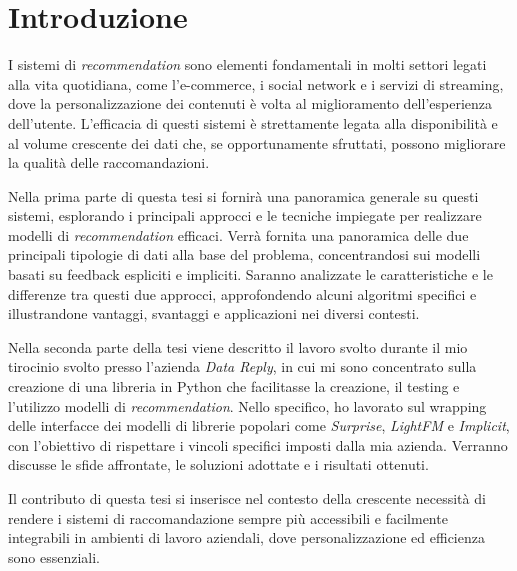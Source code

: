 \chapter{Introduzione}

I sistemi di \textit{recommendation} sono elementi fondamentali in molti settori legati alla vita quotidiana, come l'e-commerce, i social network e i servizi di streaming, dove la personalizzazione dei contenuti è volta al miglioramento dell'esperienza dell'utente. L'efficacia di questi sistemi è strettamente legata alla disponibilità e al volume crescente dei dati che, se opportunamente sfruttati, possono migliorare la qualità delle raccomandazioni.

Nella prima parte di questa tesi si fornirà una panoramica generale su questi sistemi, esplorando i principali approcci e le tecniche impiegate per realizzare modelli di \textit{recommendation} efficaci. Verrà fornita una panoramica delle due principali tipologie di dati alla base del problema, concentrandosi sui modelli basati su feedback espliciti e impliciti. Saranno analizzate le caratteristiche e le differenze tra questi due approcci, approfondendo alcuni algoritmi specifici e illustrandone vantaggi, svantaggi e applicazioni nei diversi contesti.

Nella seconda parte della tesi viene descritto il lavoro svolto durante il mio tirocinio svolto presso l'azienda \textit{Data Reply}, in cui mi sono concentrato sulla creazione di una libreria in Python che facilitasse la creazione, il testing e l'utilizzo modelli di \textit{recommendation}. Nello specifico, ho lavorato sul wrapping delle interfacce dei modelli di librerie popolari come \textit{Surprise}, \textit{LightFM} e \textit{Implicit}, con l'obiettivo di rispettare i vincoli specifici imposti dalla mia azienda. Verranno discusse le sfide affrontate, le soluzioni adottate e i risultati ottenuti.

Il contributo di questa tesi si inserisce nel contesto della crescente necessità di rendere i sistemi di raccomandazione sempre più accessibili e facilmente integrabili in ambienti di lavoro aziendali, dove personalizzazione ed efficienza sono essenziali.
